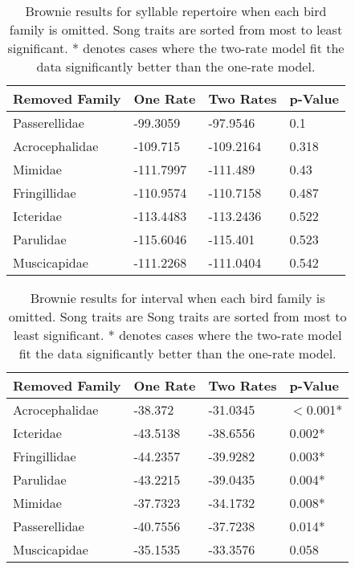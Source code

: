 \documentclass[a4paper,12pt]{article}
\begin{document}
\begin{table}[ht]
\caption{Brownie results for syllable repertoire when each bird family is omitted. Song traits are sorted from most to least significant. * denotes cases where the two-rate model fit the data significantly better than the one-rate model.}
\centering
\begin{tabular}{llll}
  \hline
Removed Family & One Rate & Two Rates & p-Value \\ 
  \hline
Passerellidae & -99.3059 & -97.9546 & 0.1 \\ 
  Acrocephalidae & -109.715 & -109.2164 & 0.318 \\ 
  Mimidae & -111.7997 & -111.489 & 0.43 \\ 
  Fringillidae & -110.9574 & -110.7158 & 0.487 \\ 
  Icteridae & -113.4483 & -113.2436 & 0.522 \\ 
  Parulidae & -115.6046 & -115.401 & 0.523 \\ 
  Muscicapidae & -111.2268 & -111.0404 & 0.542 \\ 
   \hline
\end{tabular}
\end{table}
\begin{table}[ht]
\caption{Brownie results for interval when each bird family is omitted. Song traits are Song traits are sorted from most to least significant. * denotes cases where the two-rate model fit the data significantly better than the one-rate model.}
\centering
\begin{tabular}{llll}
  \hline
Removed Family & One Rate & Two Rates & p-Value \\ 
  \hline
Acrocephalidae & -38.372 & -31.0345 & $<$0.001* \\ 
  Icteridae & -43.5138 & -38.6556 & 0.002* \\ 
  Fringillidae & -44.2357 & -39.9282 & 0.003* \\ 
  Parulidae & -43.2215 & -39.0435 & 0.004* \\ 
  Mimidae & -37.7323 & -34.1732 & 0.008* \\ 
  Passerellidae & -40.7556 & -37.7238 & 0.014* \\ 
  Muscicapidae & -35.1535 & -33.3576 & 0.058 \\ 
   \hline
\end{tabular}
\end{table}
\end{document}
